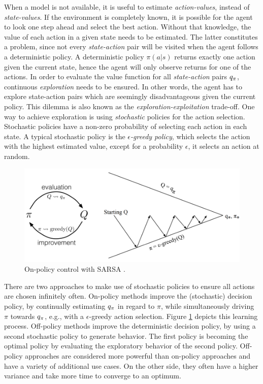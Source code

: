 \documentclass[a4paper, twoside, 12pt]{article}
\let\cite\shortcite
\begin{document}
When a model is not available, it is useful to estimate \emph{action-values}, instead
of \emph{state-values}. If the environment is completely known, it is possible for
the agent to look one step ahead and select the best action. Without that
knowledge, the value of each action in a given state needs to be estimated. The
latter constitutes a problem, since not every \emph{state-action} pair will be
visited when the agent follows a deterministic policy. A deterministic policy
\(\pi(a|s)\) returns exactly one action given the current state, hence the agent
will only observe returns for one of the actions. In order to evaluate the value
function for all \emph{state-action} pairs \(q_\pi\), continuous \emph{exploration} needs to
be ensured. In other words, the agent has to explore state-action pairs which
are seemingly disadvantageous given the current policy. This dilemma is also
known as the \emph{exploration-exploitation} trade-off. One way to achieve exploration
is using \emph{stochastic} policies for the action selection. Stochastic policies
have a non-zero probability of selecting each action in each state. A typical
stochastic policy is the \emph{\(\epsilon\)-greedy policy}, which selects the action with
the highest estimated value, except for a probability \(\epsilon\), it selects an
action at random.
\begin{figure}[htbp]
\centering
\includegraphics[width=.9\linewidth]{./fig/on-policy.png}
\caption[On-policy control with SARSA]{On-policy control with SARSA \cite{sutton18_reinf}. \protect\footnotemark \label{fig-sarsa}}
\end{figure}

There are two approaches to make use of stochastic policies to ensure all
actions are chosen infinitely often. On-policy methods improve the (stochastic)
decision policy, by continually estimating \(q_\pi\) in regard to \(\pi\), while
simultaneously driving \(\pi\) towards \(q_\pi\), e.g., with a \(\epsilon\)-greedy action
selection. Figure \ref{fig-sarsa} depicts this learning process. Off-policy
methods improve the deterministic decision policy, by using a second stochastic
policy to generate behavior. The first policy is becoming the optimal policy by
evaluating the exploratory behavior of the second policy. Off-policy approaches
are considered more powerful than on-policy approaches and have a variety of
additional use cases. On the other side, they often have a higher variance and
take more time to converge to an optimum.
\end{document}
